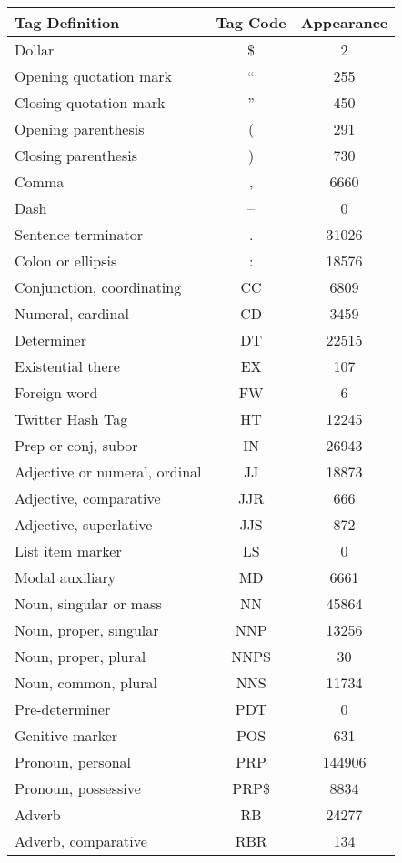 \documentclass[conference,compsoc]{IEEEtran}
\begin{document}
\begin{center}
	\begin{tabular}{|l|c|c|}
		\hline
			\bf Tag Definition & \bf Tag Code & \bf Appearance \\
		\hline
			Dollar & \$ & 2 \\
			Opening quotation mark & `` & 255 \\
			Closing quotation mark & '' & 450 \\
			Opening parenthesis & ( & 291 \\
			Closing parenthesis & ) & 730 \\
			Comma & , & 6660 \\
			Dash & -- & 0 \\
			Sentence terminator & . & 31026 \\
			Colon or ellipsis & : & 18576 \\
			Conjunction, coordinating & CC & 6809 \\
			Numeral, cardinal & CD & 3459 \\
			Determiner & DT & 22515 \\
			Existential there & EX & 107 \\
			Foreign word & FW & 6 \\
			Twitter Hash Tag & HT & 12245 \\
			Prep or conj, subor & IN & 26943 \\
			Adjective or numeral, ordinal & JJ & 18873 \\
			Adjective, comparative & JJR & 666 \\
			Adjective, superlative & JJS & 872 \\
			List item marker & LS & 0 \\
			Modal auxiliary & MD & 6661 \\
			Noun, singular or mass & NN & 45864 \\
			Noun, proper, singular & NNP & 13256 \\
			Noun, proper, plural & NNPS & 30 \\
			Noun, common, plural & NNS & 11734 \\
			Pre-determiner & PDT & 0 \\
			Genitive marker & POS & 631 \\
			Pronoun, personal & PRP & 144906 \\
			Pronoun, possessive & PRP\$ & 8834 \\
			Adverb & RB & 24277 \\
			Adverb, comparative & RBR & 134 \\

\end{tabular}
\end{center}
\end{document}
